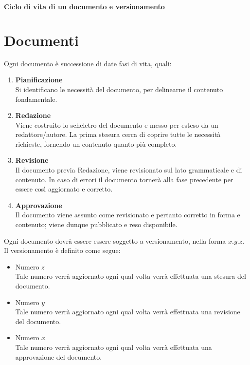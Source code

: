 \begin{center}
    \textbf{Ciclo di vita di un documento e versionamento}
\end{center}

\section{Documenti}
Ogni documento è successione di date fasi di vita, quali:

\begin{enumerate}
    \item \textbf{Pianificazione} \\
    Si identificano le necessità del documento, per delinearne il contenuto fondamentale.
    \item \textbf{Redazione} \\
    Viene costruito lo scheletro del documento e messo per esteso da un redattore/autore. La prima stesura cerca di coprire tutte le necessità richieste, fornendo un contenuto quanto più completo.
    \item \textbf{Revisione} \\
    Il documento previa Redazione, viene revisionato sul lato grammaticale e di contenuto. In caso di errori il documento tornerà alla fase precedente per essere così aggiornato e corretto.
    \item \textbf{Approvazione} \\
    Il documento viene assunto come revisionato e pertanto corretto in forma e contenuto; viene dunque pubblicato e reso disponibile.\\
\end{enumerate}

Ogni documento dovrà essere essere soggetto a versionamento, nella forma $x.y.z$.\\

Il versionamento è definito come segue:
\begin{itemize}
    \item Numero $z$\\
    Tale numero verrà aggiornato ogni qual volta verrà effettuata una stesura del documento.
    \item Numero $y$\\
    Tale numero verrà aggiornato ogni qual volta verrà effettuata una revisione del documento.
    \item Numero $x$\\
    Tale numero verrà aggiornato ogni qual volta verrà effettuata una approvazione del documento.\\
\end{itemize}
 
